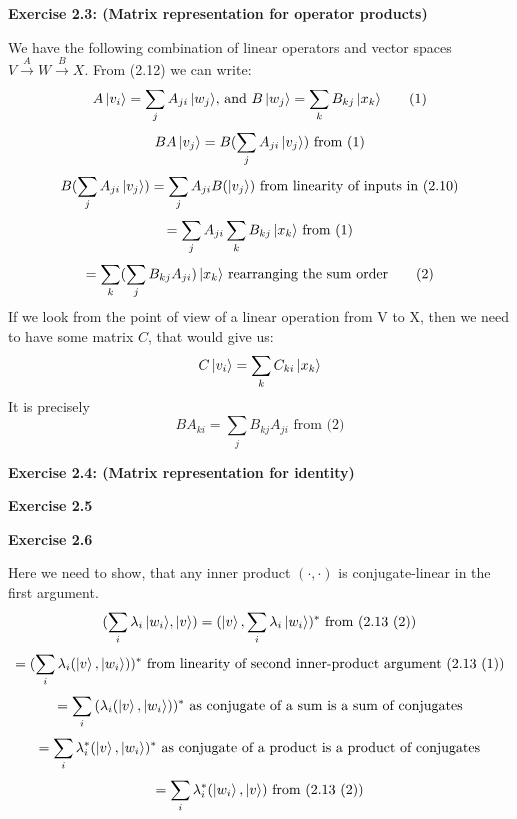 \documentclass{article}
\begin{document}
\bigskip

\begin{framed}
    \noindent \textbf{Exercise 2.3: (Matrix representation for operator products)}

    \medskip
    We have the following combination of linear operators and vector spaces $V \xrightarrow{A} W \xrightarrow{B} X$. From (2.12) we can write: 
    \begin{equation}
        A\ket{v_i} = \sum_{j}{A_{ji}\ket{w_j}}\text{, and } B\ket{w_j} = \sum_{k}{B_{kj}\ket{x_k}} 
        \tag{1}
    \end{equation}
    $$BA\ket{v_j} = B(\sum_{j}{A_{ji}\ket{v_j}}) \text{ from (1)}$$
    $$
    B(\sum_{j}{A_{ji}\ket{v_j}}) = \sum_{j}{A_{ji}B(\ket{v_j}}) \text{ from linearity of inputs in (2.10)}
    $$
    $$
     = \sum_{j}{A_{ji}\sum_{k}{B_{kj}\ket{x_k}}} \text{ from (1)}
    $$
    \begin{equation}
    = \sum_k(\sum_j{B_{kj}A_{ji}) \ket{x_k}} \text{ rearranging the sum order}
    \tag{2}
    \end{equation}
    If we look from the point of view of a linear operation from V to X, then we need to have some matrix $C$, that would give us:
    $$C\ket{v_i} = \sum_k{C_{ki}\ket{x_k}}$$
    It is precisely 
    $$
    BA_{ki} = \sum_j{B_{kj}A_{ji}} \text{ from (2)}
    $$
\end{framed}

\bigskip

\begin{framed}
    \noindent \textbf{Exercise 2.4: (Matrix representation for identity)}

    \medskip
    
\end{framed}

\bigskip

\begin{framed}
    \noindent \textbf{Exercise 2.5}

    \medskip
\end{framed}

\bigskip

\begin{framed}
    \noindent \textbf{Exercise 2.6}
    
    \medskip
    
    Here we need to show, that any inner product $(\cdot, \cdot)$ is conjugate-linear in the first argument.
    $$
    (\sum_{i}{\lambda_i \ket{w_i}}, \ket{v}) = (\ket{v}, \sum_{i}{\lambda_i \ket{w_i}})^{*} \text{ from (2.13 (2))}
    $$
    $$
    = (\sum_{i}{\lambda_i(\ket{v}, \ket{w_i})})^{*} \text{ from linearity of second inner-product argument (2.13 (1))}
    $$
    $$
    = \sum_{i}{(\lambda_i(\ket{v}, \ket{w_i}))^*} \text{ as conjugate of a sum is a sum of conjugates}
    $$
    $$
    = \sum_{i}{\lambda_i^*(\ket{v}, \ket{w_i})^*}  \text{ as conjugate of a product is a product of conjugates}
    $$
    $$
    = \sum_{i}{\lambda_i^*(\ket{w_i}, \ket{v})} \text{ from (2.13 (2))}
    $$
    
\end{framed}
\end{document}
